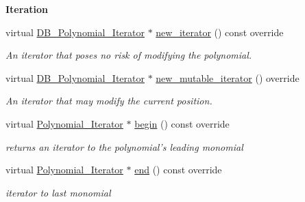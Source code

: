 \begin{Indent}\textbf{ Iteration}\par
\begin{DoxyCompactItemize}
\item 
\mbox{\label{group__polygroup_a224ae300d1789243ca05e4413c473a6f}} 
virtual \hyperlink{group___iterator_group_class_d_b___polynomial___iterator}{D\+B\+\_\+\+Polynomial\+\_\+\+Iterator} $\ast$ \hyperlink{group__polygroup_a224ae300d1789243ca05e4413c473a6f}{new\+\_\+iterator} () const override
\begin{DoxyCompactList}\small\item\em An iterator that poses no risk of modifying the polynomial. \end{DoxyCompactList}\item 
\mbox{\label{group__polygroup_aabbde4f088511cb480e959eaac056784}} 
virtual \hyperlink{group___iterator_group_class_d_b___polynomial___iterator}{D\+B\+\_\+\+Polynomial\+\_\+\+Iterator} $\ast$ \hyperlink{group__polygroup_aabbde4f088511cb480e959eaac056784}{new\+\_\+mutable\+\_\+iterator} () override
\begin{DoxyCompactList}\small\item\em An iterator that may modify the current position. \end{DoxyCompactList}\item 
\mbox{\label{group__polygroup_a85169b0b1146537bb69127f3c1a866ff}} 
virtual \hyperlink{group___iterator_group_class_polynomial___iterator}{Polynomial\+\_\+\+Iterator} $\ast$ \hyperlink{group__polygroup_a85169b0b1146537bb69127f3c1a866ff}{begin} () const override
\begin{DoxyCompactList}\small\item\em returns an iterator to the polynomial's leading monomial \end{DoxyCompactList}\item 
\mbox{\label{group__polygroup_ad89a902fa53246364fbef37eefa44080}} 
virtual \hyperlink{group___iterator_group_class_polynomial___iterator}{Polynomial\+\_\+\+Iterator} $\ast$ \hyperlink{group__polygroup_ad89a902fa53246364fbef37eefa44080}{end} () const override
\begin{DoxyCompactList}\small\item\em iterator to last monomial \end{DoxyCompactList}\end{DoxyCompactItemize}
\end{Indent}
